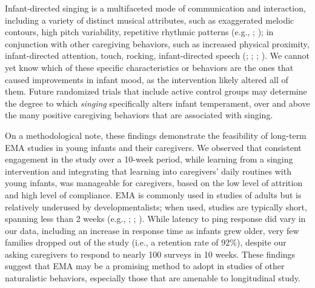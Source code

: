 \documentclass[
]{article}
\begin{document}
Infant-directed singing is a multifaceted mode of communication and
interaction, including a variety of distinct musical attributes, such as
exaggerated melodic contours, high pitch variability, repetitive
rhythmic patterns (e.g., ; ); in conjunction with other caregiving behaviors, such as
increased physical proximity, infant-directed attention, touch, rocking,
infant-directed speech (;
;
;
). We cannot
yet know which of these specific characteristics or behaviors are the
ones that caused improvements in infant mood, as the intervention likely
altered all of them. Future randomized trials that include active
control groups may determine the degree to which \emph{singing}
specifically alters infant temperament, over and above the many positive
caregiving behaviors that are associated with singing.

On a methodological note, these findings demonstrate the feasibility of
long-term EMA studies in young infants and their caregivers. We observed
that consistent engagement in the study over a 10-week period, while
learning from a singing intervention and integrating that learning into
caregivers' daily routines with young infants, was manageable for
caregivers, based on the low level of attrition and high level of
compliance. EMA is commonly used in studies of adults but is relatively
underused by developmentalists; when used, studies are typically short,
spanning less than 2 weeks (e.g., ; ;
). While latency to ping
response did vary in our data, including an increase in response time as
infants grew older, very few families dropped out of the study (i.e., a
retention rate of 92\%), despite our asking caregivers to respond to
nearly 100 surveys in 10 weeks. These findings suggest that EMA may be a
promising method to adopt in studies of other naturalistic behaviors,
especially those that are amenable to longitudinal study.
\end{document}
